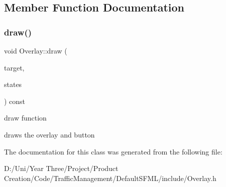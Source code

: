 \subsection{Member Function Documentation}
\hypertarget{class_overlay_abe32d7e0e71733150f7a28cf3e851aa1}{}\label{class_overlay_abe32d7e0e71733150f7a28cf3e851aa1} 
\subsubsection{\texorpdfstring{draw()}{draw()}}
{\footnotesize\ttfamily void Overlay\+::draw (\begin{DoxyParamCaption}\item[{Render\+Target \&}]{target,  }\item[{Render\+States}]{states }\end{DoxyParamCaption}) const}



draw function 

draws the overlay and button 

The documentation for this class was generated from the following file\+:\begin{DoxyCompactItemize}
\item 
D\+:/\+Uni/\+Year Three/\+Project/\+Product Creation/\+Code/\+Traffic\+Management/\+Default\+S\+F\+M\+L/include/Overlay.\+h\end{DoxyCompactItemize}
